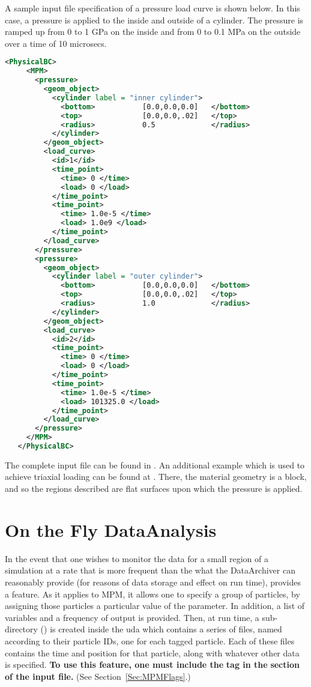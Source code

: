 A sample input file specification of a pressure load curve is shown below.
In this case, a pressure is applied to the inside and outside of a cylinder.
The pressure is ramped up from 0 to 1 GPa on the inside and from 0 to 0.1 MPa
on the outside over a time of 10 microsecs.
\begin{lstlisting}[language=XML]
   <PhysicalBC>
     <MPM>
       <pressure>
         <geom_object>
           <cylinder label = "inner cylinder">
             <bottom>           [0.0,0.0,0.0]   </bottom>
             <top>              [0.0,0.0,.02]   </top>
             <radius>           0.5             </radius>
           </cylinder>
         </geom_object>
         <load_curve>
           <id>1</id>
           <time_point>
             <time> 0 </time>
             <load> 0 </load>
           </time_point>
           <time_point>
             <time> 1.0e-5 </time>
             <load> 1.0e9 </load>
           </time_point>
         </load_curve>
       </pressure>
       <pressure>
         <geom_object>
           <cylinder label = "outer cylinder">
             <bottom>           [0.0,0.0,0.0]   </bottom>
             <top>              [0.0,0.0,.02]   </top>
             <radius>           1.0             </radius>
           </cylinder>
         </geom_object>
         <load_curve>
           <id>2</id>
           <time_point>
             <time> 0 </time>
             <load> 0 </load>
           </time_point>
           <time_point>
             <time> 1.0e-5 </time>
             <load> 101325.0 </load>
           </time_point>
         </load_curve>
       </pressure>
     </MPM>
   </PhysicalBC>
\end{lstlisting}
The complete input file can be found in . 
An additional example which is used to achieve triaxial loading can be found
at .  There, the material geometry is a block, and so
the regions described are flat surfaces upon which the pressure is applied.

\section{On the Fly DataAnalysis} \label{Sec:OTFA_MPM}

In the event that one wishes to monitor the data for a small region of a
simulation at a rate that is more frequent than the what the DataArchiver
can reasonably provide (for reasons of data storage and effect on run time),
\Vaango provides a  feature.  As it applies
to MPM, it allows one to specify a group of particles, by assigning those
particles a particular value of the  parameter.
In addition, a list of variables and a frequency of output is provided.
Then, at run time, a sub-directory ()
is created inside the uda which contains
a series of files, named according to their particle IDs, one for each
tagged particle.  Each of these files contains the time and position for
that particle, along with whatever other data is specified.  {\bf To use this
feature, one must include the} 
{\bf tag in the}  {\bf section of the input file.}
(See Section~\ref{Sec:MPMFlags}.)

